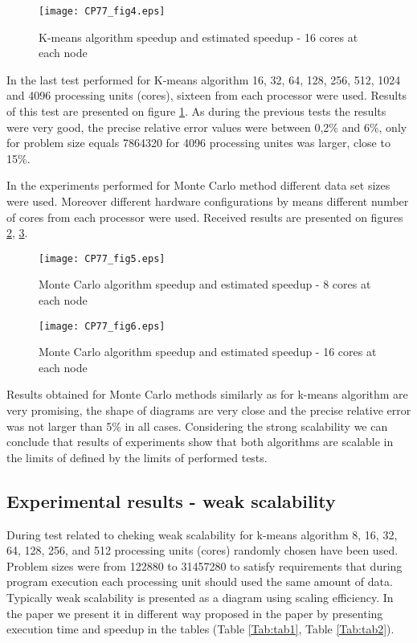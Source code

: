 \documentclass[runningheads]{llncs}
\begin{document}
\begin{figure}[bht!]
  \centering
  \texttt{[image: CP77\_fig4.eps]}
  \caption{K-means algorithm speedup and estimated speedup - 16 cores at each node}
  \label{fig_k-means_speedup_16_cores}
\end{figure}

In the last test performed for K-means algorithm 16, 32, 64, 128, 256, 512, 1024 and 4096 processing units (cores), sixteen from each processor were used. Results of this test are presented on figure \ref{fig_k-means_speedup_16_cores}. As during the previous tests the results were very good, the precise relative error values were between 0,2\% and 6\%, only for problem size equals 7864320 for 4096 processing unites was larger, close to 15\%.

In the experiments performed for Monte Carlo method different data set sizes were used. Moreover different hardware configurations by means different number of cores from each processor were used. Received results are presented on figures  \ref{fig_monte_carlo_speedup_8_cores}, \ref{fig_monte_carlo_speedup_16_cores}.

\begin{figure}[bht!]
  \centering
  \texttt{[image: CP77\_fig5.eps]}
  \caption{Monte Carlo algorithm speedup and estimated speedup - 8 cores at each node}
  \label{fig_monte_carlo_speedup_8_cores}
\end{figure}

\begin{figure}[bht!]
  \centering
  \texttt{[image: CP77\_fig6.eps]}
  \caption{Monte Carlo algorithm speedup and estimated speedup - 16 cores at each node}
  \label{fig_monte_carlo_speedup_16_cores}
\end{figure}

Results obtained for Monte Carlo methods similarly as for k-means algorithm are very promising, the shape of diagrams are very close and the precise relative error was not larger than 5\% in all cases. Considering the strong scalability we can conclude that results of experiments show that both algorithms are scalable in the limits of defined by the limits of performed tests. 

\subsection{Experimental results - weak scalability}

During test related to cheking weak scalability for k-means algorithm  8, 16, 32, 64, 128, 256, and 512 processing units (cores) randomly chosen have been used. Problem sizes were from 122880 to 31457280 to satisfy requirements that during program execution each processing unit should used the same amount of data. Typically weak scalability is presented as a diagram using scaling efficiency. In the paper we present it in different way proposed in the paper \cite{kartawidjaja} by presenting execution time and speedup in the tables (Table \ref{Tab:tab1}, Table \ref{Tab:tab2}). 
\end{document}
